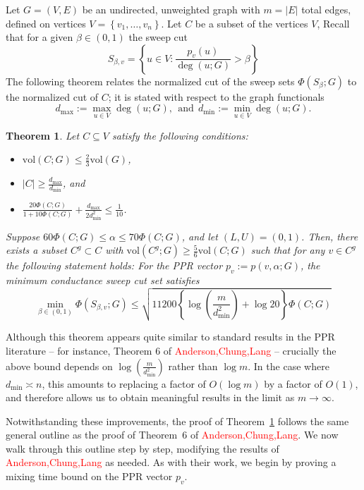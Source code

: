 \documentclass[11pt,twoside]{article}
\newtheorem{theorem}{Theorem}
\newcommand{\set}[1]{\left\{#1\right\}}
\newcommand{\vol}{\mathrm{vol}}
\newcommand{\abs}[1]{\left \lvert #1 \right \rvert}
\newcommand{\1}{\mathbf{1}}
\begin{document}
Let $G = (V,E)$ be an undirected, unweighted graph with $m = \abs{E}$ total edges, defined on vertices $V = \set{v_1, \ldots, v_n}$. Let $C$ be a subset of the vertices $V$, Recall that for a given $\beta \in (0,1)$ the sweep cut 
\begin{equation*}
S_{\beta,v} = \set{u \in V: \frac{p_v(u)}{\deg(u;G)} > \beta}
\end{equation*} 
The following theorem relates the normalized cut of the sweep sets $\Phi(S_{\beta};G)$ to the normalized cut of $C$; it is stated with respect to the graph functionals 
\begin{equation*}
d_{\max} := \max_{u \in V} \deg(u;G), ~~\textrm{and}~~ d_{\min} := \min_{u \in V} \deg(u;G).
\end{equation*}
\begin{theorem}
	\label{thm:conductance_ppr}
	Let $C \subseteq V$ satisfy the following conditions:
	\begin{itemize}
		\item $\vol(C;G) \leq \frac{2}{3}\vol(G)$,
		\item $\abs{C} \geq \frac{d_{\max}}{d_{\min}}$, and
		\item $\frac{20\Phi(C;G)}{1 + 10\Phi(C;G)} + \frac{d_{\max}}{2d_{\min}^2} \leq \frac{1}{10}$.
	\end{itemize}
	Suppose $60\Phi(C;G) \leq \alpha \leq 70\Phi(C;G)$, and let $(L,U) = (0,1)$. Then, there exists a subset $C^g \subset C$ with $\vol(C^g;G) \geq \frac{5}{6}\vol(C;G)$ such that for any $v \in C^g$ the following statement holds: For the PPR vector $p_v := p(v,\alpha;G)$, the minimum conductance sweep cut set satisfies 
	\begin{equation*}
	\min_{\beta \in (0,1)}\Phi(S_{\beta,v};G) \leq \sqrt{11200\left\{\log\left(\frac{m}{d_{\min}^2}\right) + \log 20\right\} \Phi(C;G)}
	\end{equation*}
\end{theorem}
Although this theorem appears quite similar to standard results in the PPR literature -- for instance, Theorem 6 of \textcolor{red}{Anderson,Chung,Lang} -- crucially the above bound depends on $\log\left(\frac{m}{d_{\min}^2}\right)$ rather than $\log m$. In the case where $d_{\min} \asymp n$, this amounts to replacing a factor of $O(\log m)$ by a factor of ${O}(1)$, and therefore allows us to obtain meaningful results in the limit as $m \to \infty$. 

Notwithstanding these improvements, the proof of Theorem~\ref{thm:conductance_ppr} follows the same general outline as the proof of Theorem~6 of \textcolor{red}{Anderson,Chung,Lang}. We now walk through this outline step by step, modifying the results of \textcolor{red}{Anderson,Chung,Lang} as needed. As with their work, we begin by proving a mixing time bound on the PPR vector $p_v$.
\end{document}
